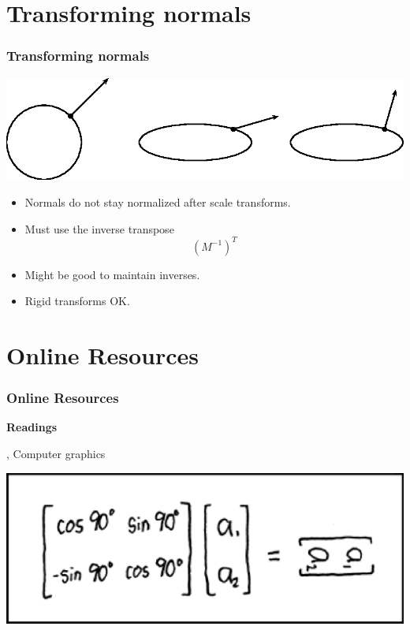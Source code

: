 \documentclass[slidestop,xcolor=pst,dvips]{beamer}
\newcommand{\sect}[1]{
\section{#1}
\begin{frame}[fragile]\frametitle{#1}
}
\begin{document}
\sect{Transforming normals}
\centerline{\includegraphics{figures/normaltransform.eps}}
\begin{itemize}
\item Normals do not stay normalized after scale transforms.
\item Must use the inverse transpose
\[
\left(M^{-1}\right)^T
\]
\item Might be good to maintain inverses.
\item Rigid transforms OK.
\end{itemize}
\end{frame}

\sect{Online Resources}
{\bf Readings}
\begin{itemize}
, Computer graphics

\end{itemize}

\vfill

\centerline{\includegraphics[scale=0.5]{figures/matrix_transform.eps}}

\end{frame}
\end{document}
